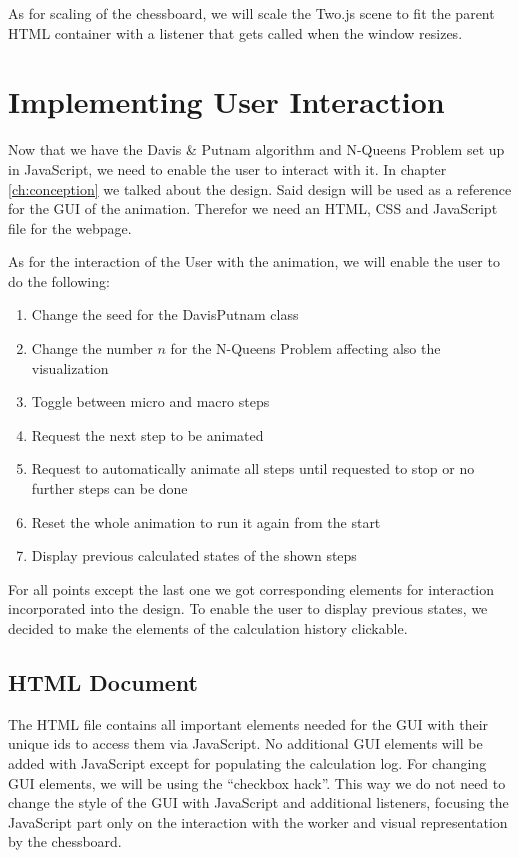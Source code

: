 As for scaling of the chessboard, we will scale the Two.js scene to fit the parent HTML container with a listener that gets called when the window resizes.

\section{Implementing User Interaction}
\label{sec:impUI}
Now that we have the Davis \& Putnam algorithm and N-Queens Problem set up in JavaScript, we need to enable the user to interact with it. In chapter \ref{ch:conception} we talked about the design. Said design will be used as a reference for the GUI of the animation. Therefor we need an HTML, CSS and JavaScript file for the webpage.

As for the interaction of the User with the animation, we will enable the user to do the following:

\begin{enumerate}
    \item Change the seed for the DavisPutnam class
    \item Change the number $n$ for the N-Queens Problem affecting also the visualization
    \item Toggle between micro and macro steps
    \item Request the next step to be animated
    \item Request to automatically animate all steps until requested to stop or no further steps can be done
    \item Reset the whole animation to run it again from the start
    \item Display previous calculated states of the shown steps
\end{enumerate}

For all points except the last one we got corresponding elements for interaction incorporated into the design. To enable the user to display previous states, we decided to make the elements of the calculation history clickable.

\subsection{HTML Document}
\label{sub:impHTML}
The HTML file contains all important elements needed for the GUI with their unique ids to access them via JavaScript. No additional GUI elements will be added with JavaScript except for populating the calculation log. For changing GUI elements, we will be using the ``checkbox hack''. This way we do not need to change the style of the GUI with JavaScript and additional listeners, focusing the JavaScript part only on the interaction with the worker and visual representation by the chessboard.

